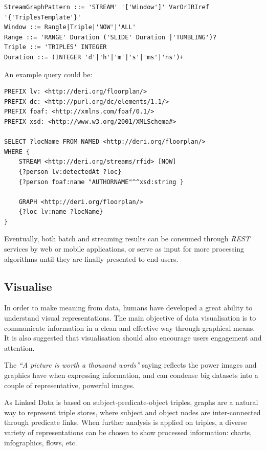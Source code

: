 \begin{lstlisting}
StreamGraphPattern ::= 'STREAM' '['Window']' VarOrIRIref
'{'TriplesTemplate'}'
Window ::= Rangle|Triple|'NOW'|'ALL'
Range ::= 'RANGE' Duration ('SLIDE' Duration |'TUMBLING')?
Triple ::= 'TRIPLES' INTEGER
Duration ::= (INTEGER 'd'|'h'|'m'|'s'|'ms'|'ns')+
\end{lstlisting}

An example query could be:

\begin{lstlisting}
PREFIX lv: <http://deri.org/floorplan/>
PREFIX dc: <http://purl.org/dc/elements/1.1/>
PREFIX foaf: <http://xmlns.com/foaf/0.1/>
PREFIX xsd: <http://www.w3.org/2001/XMLSchema#>

SELECT ?locName FROM NAMED <http://deri.org/floorplan/>
WHERE {
	STREAM <http://deri.org/streams/rfid> [NOW]
	{?person lv:detectedAt ?loc}
	{?person foaf:name "AUTHORNAME"^^xsd:string }

	GRAPH <http://deri.org/floorplan/>
	{?loc lv:name ?locName}
}
\end{lstlisting}

Eventually, both batch and streaming results can be consumed through \textit{REST} services by web or mobile applications, or serve as input for more processing algorithms until they are finally presented to end-users.

\subsection{Visualise}

In order to make meaning from data, humans have developed a great ability to understand visual representations. The main objective of data visualisation is to communicate information in a clean and effective way through graphical means. It is also suggested that visualisation should also encourage users engagement and attention.

The \textit{``A picture is worth a thousand words''} saying reflects the power images and graphics have when expressing information, and can condense big datasets into a couple of representative, powerful images.

As Linked Data is based on subject-predicate-object triples, graphs are a natural way to represent triple stores, where subject and object nodes are inter-connected through predicate links. When further analysis is applied on triples, a diverse variety of representations can be chosen to show processed information: charts, infographics, flows, etc.\cite{khan2011data}

